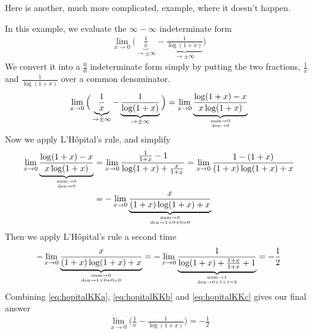 \begin{enumerate}[(a)]
Here is another, much more complicated, example, where it doesn't happen.
\begin{eg}\label{eg:hopitalKK}
In this example, we evaluate the $\infty-\infty$ indeterminate form
\begin{align*}
\lim_{x\rightarrow 0}\Big(
                \underbrace{\frac{1}{x}}_{\rightarrow \pm\infty}
              - \underbrace{\frac{1}{\log(1+x)}}_{\rightarrow\pm\infty}\Big)
\end{align*}
We convert it into a $\frac{0}{0}$ indeterminate form simply
by putting the two fractions, $\frac{1}{x}$ and $\frac{1}{\log(1+x)}$
over a common denominator.
\begin{equation}\label{eq:hopitalKKa}
\lim_{x\rightarrow 0}\Big(
                \underbrace{\frac{1}{x}}_{\rightarrow \pm\infty}
              - \underbrace{\frac{1}{\log(1+x)}}_{\rightarrow\pm\infty}\Big)
=\lim_{x\rightarrow 0}\underbrace{\frac{\log(1+x)-x}{x\log(1+x)}}_{\atp
        {\mathrm{num}\rightarrow 0}
        {\mathrm{den}\rightarrow 0}}
\end{equation}
Now we apply L'H\^opital's rule, and simplify
\begin{align}
\lim_{x\rightarrow 0}\underbrace{\frac{\log(1+x)-x}{x\log(1+x)}}_{\atp
        {\mathrm{num}\rightarrow 0}
        {\mathrm{den}\rightarrow 0}}
&=\lim_{x\rightarrow 0}\frac{\frac{1}{1+x}-1} {\log(1+x)+\frac{x}{1+x}}
=\lim_{x\rightarrow 0}\frac{1-(1+x)} {(1+x)\log(1+x)+x}\notag\\
&=-\lim_{x\rightarrow 0}\underbrace{\frac{x} {(1+x)\log(1+x)+x}}_{\atp
        {\mathrm{num}\rightarrow 0}
        {\mathrm{den}\rightarrow 1\times 0+0=0}} \label{eq:hopitalKKb}
\end{align}
Then we apply  L'H\^opital's rule a second time
\begin{equation}\label{eq:hopitalKKc}
-\lim_{x\rightarrow 0}\underbrace{\frac{x} {(1+x)\log(1+x)+x}}_{\atp
        {\mathrm{num}\rightarrow 0}
        {\mathrm{den}\rightarrow 1\times 0+0=0}}
=-\lim_{x\rightarrow 0}\underbrace{\frac{1} {\log(1+x)+\frac{1+x}{1+x}+1}}_{\atp
        {\mathrm{num}\rightarrow 1}
        {\mathrm{den}\rightarrow 0+1+1=2}}
=-\frac{1}{2}
\end{equation}
Combining \eqref{eq:hopitalKKa}, \eqref{eq:hopitalKKb} and
\eqref{eq:hopitalKKc} gives our final answer
\begin{align*}
\lim_{x\rightarrow 0}\Big(\frac{1}{x} - \frac{1}{\log(1+x)}\Big)
=-\frac{1}{2}
\end{align*}
\end{eg}


\end{enumerate}
